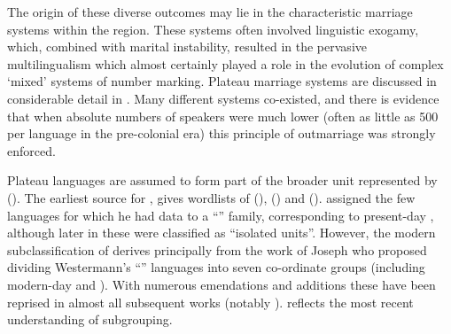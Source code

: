 \documentclass[output=paper]{langsci/langscibook}
\begin{document}
\clearpage 
The origin of these diverse outcomes may lie in the characteristic marriage systems within the  region. These systems often involved linguistic exogamy, which, combined with marital instability, resulted in the pervasive multilingualism which almost certainly played a role in the evolution of complex ‘mixed’ systems of number marking. Plateau marriage systems are discussed in considerable detail in \citet{Muller1982}. Many different systems co-existed, and there is evidence that when absolute numbers of speakers were much lower (often as little as 500 per language in the pre-colonial era) this principle of outmarriage was strongly enforced.

Plateau languages are assumed to form part of the broader unit represented by  (\citealt{Williamson1971,Williamson1989,WilliamsonBlench2000}). The earliest source for , \citet{Koelle1854} gives wordlists of  (),  () and  (). \citet{Westermann1927} assigned the few languages for which he had data to a ``'' family, corresponding to present-day , although later in \citet{WestermannBryan1952} these were classified as ``isolated units''. However, the modern subclassification of  derives principally from the work of Joseph \citet{Greenberg1963} who proposed dividing Westermann’s ``'' languages into seven co-ordinate groups (including modern-day  and ). With numerous emendations and additions these have been reprised in almost all subsequent works (notably \citealt{WilliamsonShimizu1968,Williamson1971,Williamson1972,Williamson1989,Maddieson1982,Gerhardt1989,CrozierBlench1992,Blench1998,Blench2000wocal}). \citet{Blenchn.d.a} reflects the most recent understanding of  subgrouping.
\end{document}
